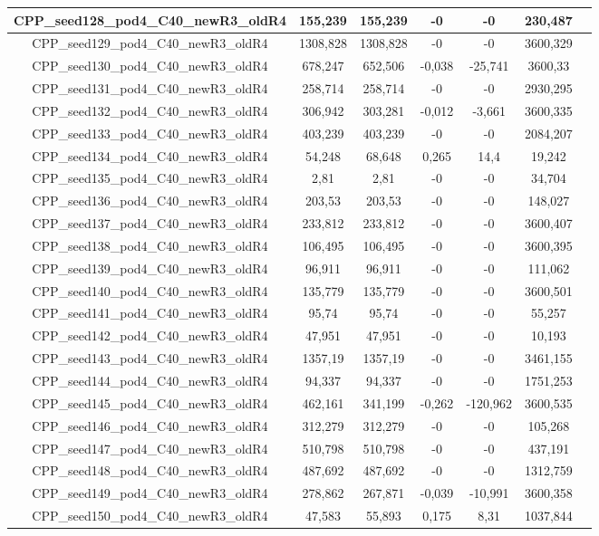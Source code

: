 \documentclass[a4paper]{article}
\begin{document}
\begin{center}
\begin{longtable}{ccccccc}
\hline
CPP\_seed128\_pod4\_C40\_newR3\_oldR4 & 155,239 & 155,239 & -0 & -0 & 230,487\\
\hline
CPP\_seed129\_pod4\_C40\_newR3\_oldR4 & 1308,828 & 1308,828 & -0 & -0 & 3600,329\\
\hline
CPP\_seed130\_pod4\_C40\_newR3\_oldR4 & 678,247 & 652,506 & -0,038 & -25,741 & 3600,33\\
\hline
CPP\_seed131\_pod4\_C40\_newR3\_oldR4 & 258,714 & 258,714 & -0 & -0 & 2930,295\\
\hline
CPP\_seed132\_pod4\_C40\_newR3\_oldR4 & 306,942 & 303,281 & -0,012 & -3,661 & 3600,335\\
\hline
CPP\_seed133\_pod4\_C40\_newR3\_oldR4 & 403,239 & 403,239 & -0 & -0 & 2084,207\\
\hline
CPP\_seed134\_pod4\_C40\_newR3\_oldR4 & 54,248 & 68,648 & 0,265 & 14,4 & 19,242\\
\hline
CPP\_seed135\_pod4\_C40\_newR3\_oldR4 & 2,81 & 2,81 & -0 & -0 & 34,704\\
\hline
CPP\_seed136\_pod4\_C40\_newR3\_oldR4 & 203,53 & 203,53 & -0 & -0 & 148,027\\
\hline
CPP\_seed137\_pod4\_C40\_newR3\_oldR4 & 233,812 & 233,812 & -0 & -0 & 3600,407\\
\hline
CPP\_seed138\_pod4\_C40\_newR3\_oldR4 & 106,495 & 106,495 & -0 & -0 & 3600,395\\
\hline
CPP\_seed139\_pod4\_C40\_newR3\_oldR4 & 96,911 & 96,911 & -0 & -0 & 111,062\\
\hline
CPP\_seed140\_pod4\_C40\_newR3\_oldR4 & 135,779 & 135,779 & -0 & -0 & 3600,501\\
\hline
CPP\_seed141\_pod4\_C40\_newR3\_oldR4 & 95,74 & 95,74 & -0 & -0 & 55,257\\
\hline
CPP\_seed142\_pod4\_C40\_newR3\_oldR4 & 47,951 & 47,951 & -0 & -0 & 10,193\\
\hline
CPP\_seed143\_pod4\_C40\_newR3\_oldR4 & 1357,19 & 1357,19 & -0 & -0 & 3461,155\\
\hline
CPP\_seed144\_pod4\_C40\_newR3\_oldR4 & 94,337 & 94,337 & -0 & -0 & 1751,253\\
\hline
CPP\_seed145\_pod4\_C40\_newR3\_oldR4 & 462,161 & 341,199 & -0,262 & -120,962 & 3600,535\\
\hline
CPP\_seed146\_pod4\_C40\_newR3\_oldR4 & 312,279 & 312,279 & -0 & -0 & 105,268\\
\hline
CPP\_seed147\_pod4\_C40\_newR3\_oldR4 & 510,798 & 510,798 & -0 & -0 & 437,191\\
\hline
CPP\_seed148\_pod4\_C40\_newR3\_oldR4 & 487,692 & 487,692 & -0 & -0 & 1312,759\\
\hline
CPP\_seed149\_pod4\_C40\_newR3\_oldR4 & 278,862 & 267,871 & -0,039 & -10,991 & 3600,358\\
\hline
CPP\_seed150\_pod4\_C40\_newR3\_oldR4 & 47,583 & 55,893 & 0,175 & 8,31 & 1037,844\\
\hline
\end{longtable}
\end{center}
\end{document}

